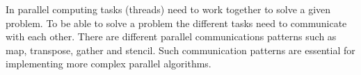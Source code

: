 In parallel computing tasks (threads) need to work together to solve a given problem. 
To be able to solve a problem the different tasks need to communicate with each other.
There are different parallel communications patterns such as map, transpose, gather and stencil.
Such communication patterns are essential for implementing more complex parallel algorithms.